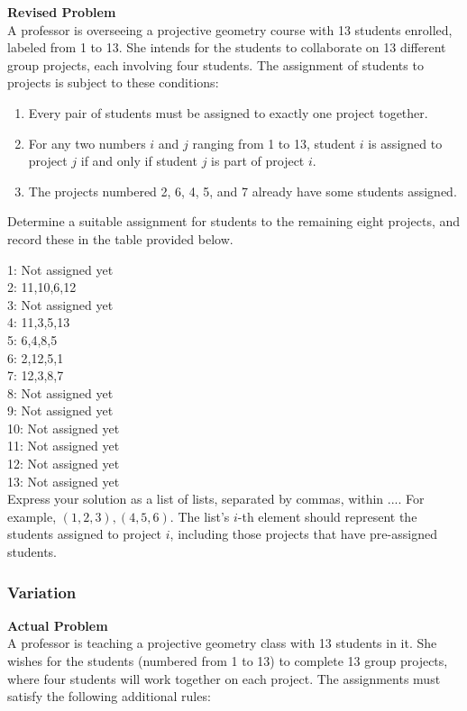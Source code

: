 \textbf{Revised Problem}\\
A professor is overseeing a projective geometry course with 13 students enrolled, labeled from 1 to 13. She intends for the students to collaborate on 13 different group projects, each involving four students. The assignment of students to projects is subject to these conditions:

\begin{enumerate}
    \item Every pair of students must be assigned to exactly one project together.
    \item For any two numbers $i$ and $j$ ranging from 1 to 13, student $i$ is assigned to project $j$ if and only if student $j$ is part of project $i$.
    \item The projects numbered 2, 6, 4, 5, and 7 already have some students assigned.
\end{enumerate}

Determine a suitable assignment for students to the remaining eight projects, and record these in the table provided below.

1: Not assigned yet \\
2: 11,10,6,12 \\
3: Not assigned yet \\
4: 11,3,5,13 \\
5: 6,4,8,5 \\
6: 2,12,5,1 \\
7: 12,3,8,7 \\
8: Not assigned yet \\
9: Not assigned yet \\
10: Not assigned yet \\
11: Not assigned yet \\
12: Not assigned yet \\
13: Not assigned yet \\

Express your solution as a list of lists, separated by commas, within $\boxed{...}$. For example, $\boxed{(1,2,3),(4,5,6)}$. The list's $i$-th element should represent the students assigned to project $i$, including those projects that have pre-assigned students.

\subsubsection{Variation}
\textbf{Actual Problem}\\
A professor is teaching a projective geometry class with 13 students in it. She wishes for the students (numbered from 1 to 13) to complete 13 group projects, where four students will work together on each project. The assignments must satisfy the following additional rules:

